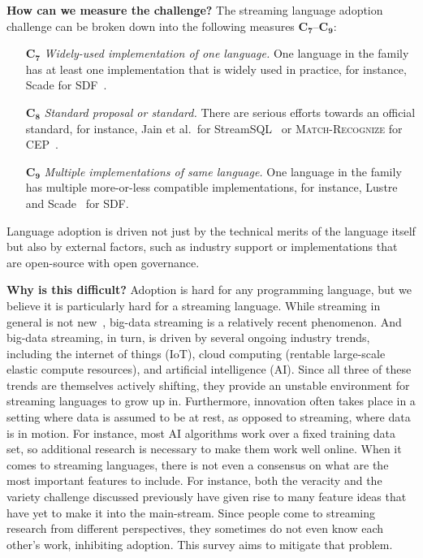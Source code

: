 \textbf{How can we measure the challenge?}
The streaming language  adoption challenge can be broken down
into the following measures $\mathbf{C_7}$--$\mathbf{C_9}$:

\begin{itemize}
  \item[$\mathbf{C_7}$] \emph{Widely-used implementation of one
    language.}  One language in the family has at least one
    implementation that is widely used in practice, for instance,
    Scade for SDF~\cite{scade_2017}.
  \item[$\mathbf{C_8}$] \emph{Standard proposal or standard.}  There
    are serious efforts towards an official standard, for instance,
    Jain et al.\ for StreamSQL~\cite{jain_et_al_2008} or
    \textsc{Match-Recognize} for CEP~\cite{zemke_et_al_2007}.
  \item[$\mathbf{C_9}$] \emph{Multiple implementations of same
    language.}  One language in the family has multiple more-or-less
    compatible implementations, for instance,
    Lustre~\cite{lustre_1987} and Scade~\cite{scade_2017} for SDF.
\end{itemize}

Language adoption is driven not just by the technical merits of the
language itself but also by external factors, such as industry support
or implementations that are open-source with open governance.

\textbf{Why is this difficult?}
Adoption is hard for any programming language, but we believe it is
particularly hard for a streaming language. While streaming in general
is not new~\cite{stephens_1997}, big-data streaming is a relatively
recent phenomenon. And big-data streaming, in turn, is driven by
several ongoing industry trends, including the internet of things
(IoT), cloud computing (rentable large-scale elastic compute
resources), and artificial intelligence (AI). Since all three of these
trends are themselves actively shifting, they provide an unstable
environment for streaming languages to grow up in. Furthermore,
innovation often takes place in a setting where data is assumed to be
at rest, as opposed to streaming, where data is in motion. For
instance, most AI algorithms work over a fixed training data set, so
additional research is necessary to make them work well online.  When
it comes to streaming languages, there is not even a consensus on what
are the most important features to include. For instance, both the
veracity and the variety challenge discussed previously have given
rise to many feature ideas that have yet to make it into the
main-stream.  Since people come to streaming research from different
perspectives, they sometimes do not even know each other's work,
inhibiting adoption. This survey aims to mitigate that problem.
